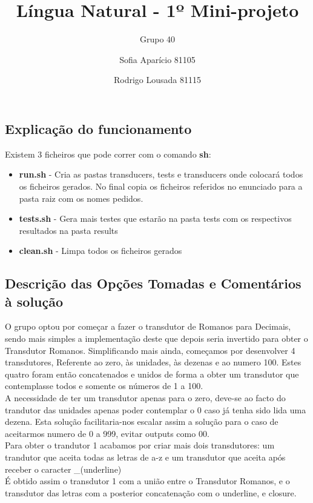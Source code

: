 \documentclass{article}
\newcommand\tab[1][1cm]{\hspace*{#1}}
\begin{document}
\title{Língua Natural - 1º Mini-projeto}
\author{Grupo 40 \and Sofia Aparício 81105 \and Rodrigo Lousada 81115}
\maketitle

\subsection*{Explicação do funcionamento}
 Existem 3 ficheiros que pode correr com o comando \textbf{sh}:
 \begin{itemize}
\item\textbf{run.sh} - Cria as pastas transducers, tests e transducers onde colocará todos os ficheiros gerados. No final copia os ficheiros referidos no enunciado para a pasta raiz com os nomes pedidos.
 \item\textbf{tests.sh} - Gera mais testes que estarão na pasta tests com os respectivos resultados na pasta results
 \item\textbf{clean.sh} - Limpa todos os ficheiros gerados
\end{itemize}

\subsection*{Descrição das Opções Tomadas e Comentários à solução}
\tab O grupo optou por começar a fazer o transdutor de Romanos para Decimais, sendo mais simples a implementação deste que depois seria invertido para obter o Transdutor Romanos. Simplificando mais ainda, começamos por desenvolver 4 transdutores, Referente ao zero, às unidades, às dezenas e ao numero 100. Estes quatro foram então concatenados e unidos de forma a obter um transdutor que contemplasse todos e somente os números de 1 a 100. \\
A necessidade de ter um transdutor apenas para o zero, deve-se ao facto do trandutor das unidades apenas poder contemplar o 0 caso já tenha sido lida uma dezena. Esta solução facilitaria-nos escalar assim a solução para o caso de aceitarmos numero de 0 a 999, evitar outputs como 00.\\

Para obter o trandutor 1 acabamos por criar mais dois transdutores: um trandutor que aceita todas as letras de a-z e um transdutor que aceita após receber o caracter \_(underline)\\
É obtido assim o transdutor 1 com a união entre o Transdutor Romanos, e o transdutor das letras com a posterior concatenação com o underline, e closure.\\
\end{document}
